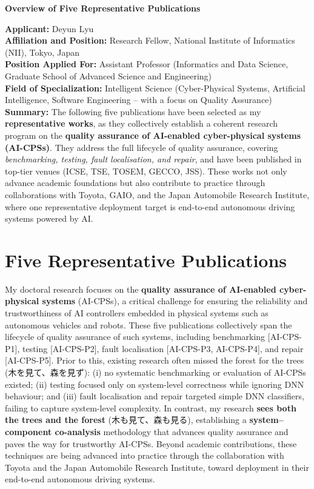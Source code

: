 \documentclass[11pt,a4paper]{article}
\title{}
\date{} %
\author{} %
\begin{document}
\begin{center}
  \Large \textbf{Overview of Five Representative Publications}
\end{center}
\vspace{0.5em}

\noindent \textbf{Applicant:} Deyun Lyu \\
\textbf{Affiliation and Position:} Research Fellow, National Institute of Informatics (NII), Tokyo, Japan\\
\textbf{Position Applied For:} Assistant Professor (Informatics and Data Science, Graduate School of Advanced Science and Engineering)\\
\textbf{Field of Specialization:} Intelligent Science (Cyber-Physical Systems, Artificial Intelligence, Software Engineering – with a focus on Quality Assurance)\\
\textbf{Summary:} The following five publications have been selected as my \textbf{representative works}, as they collectively establish a coherent research program on the \textbf{quality assurance of AI-enabled cyber-physical systems (AI-CPSs)}. They address the full lifecycle of quality assurance, covering \textit{benchmarking, testing, fault localisation, and repair}, and have been published in top-tier venues (ICSE, TSE, TOSEM, GECCO, JSS). These works not only advance academic foundations but also contribute to practice through collaborations with Toyota, GAIO, and the Japan Automobile Research Institute, where one representative deployment target is end-to-end autonomous driving systems powered by AI.

\section*{Five Representative Publications}

My doctoral research focuses on the \textbf{quality assurance of AI-enabled cyber-physical systems} (AI-CPSs), a critical challenge for ensuring the reliability and trustworthiness of AI controllers embedded in physical systems such as autonomous vehicles and robots. These five publications collectively span the lifecycle of quality assurance of such systems, including benchmarking [AI-CPS-P1], testing [AI-CPS-P2], fault localisation [AI-CPS-P3, AI-CPS-P4], and repair [AI-CPS-P5]. Prior to this, existing research often missed the forest for the trees (木を見て、森を見ず): (i) no systematic benchmarking or evaluation of AI-CPSs existed; (ii) testing focused only on system-level correctness while ignoring DNN behaviour; and (iii) fault localisation and repair targeted simple DNN classifiers, failing to capture system-level complexity. In contrast, my research \textbf{sees both the trees and the forest} (木も見て、森も見る), establishing a \textbf{system–component co-analysis} methodology that advances quality assurance and paves the way for trustworthy AI-CPSs. Beyond academic contributions, these techniques are being advanced into practice through the collaboration with Toyota and the Japan Automobile Research Institute, toward deployment in their end-to-end autonomous driving systems.
\end{document}

